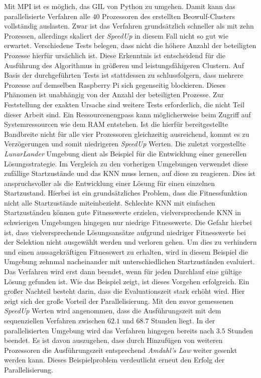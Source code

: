 Mit \ac{MPI} ist es möglich, das \ac{GIL} von Python zu umgehen. Damit kann das parallelisierte Verfahren alle $40$ Prozessoren des erstellten Beowulf-Clusters vollständig auslasten. Zwar ist das Verfahren grundsätzlich schneller als mit zehn Prozessen, allerdings skaliert der \emph{SpeedUp} in diesem Fall nicht so gut wie erwartet. Verschiedene Tests belegen, dass nicht die höhere Anzahl der beteiligten Prozesse hierfür ursächlich ist. Diese Erkenntnis ist entscheidend für die Ausführung des Algorithmus in größeren und leistungsfähigeren Clustern. Auf Basis der durchgeführten Tests ist stattdessen zu schlussfolgern, dass mehrere Prozesse auf demselben Raspberry Pi sich gegenseitig blockieren. Dieses Phänomen ist unabhängig von der Anzahl der beteiligten Prozesse. Zur Feststellung der exakten Ursache sind weitere Tests erforderlich, die nicht Teil dieser Arbeit sind. Ein Ressourcenengpass kann möglicherweise beim Zugriff auf Systemressourcen wie dem \ac{RAM} entstehen. Ist die hierfür bereitgestellte Bandbreite nicht für alle vier Prozessoren gleichzeitig ausreichend, kommt es zu Verzögerungen und somit niedrigeren \emph{SpeedUp} Werten. Die zuletzt vorgestellte \emph{LunarLander} Umgebung dient als Beispiel für die Entwicklung einer generellen Lösungsstrategie. Im Vergleich zu den vorherigen Umgebungen verwendet diese zufällige Startzustände und das \ac{KNN} muss lernen, auf diese zu reagieren. Dies ist anspruchsvoller als die Entwicklung einer Lösung für einen einzelnen Startzustand. Hierbei ist ein grundsätzliches Problem, dass die Fitnessfunktion nicht alle Startzustände miteinbezieht. Schlechte \ac{KNN} mit einfachen Startzuständen können gute Fitnesswerte erzielen, vielversprechende \ac{KNN} in schwierigen Umgebungen hingegen nur niedrige Fitnesswerte. Die Gefahr hierbei ist, dass vielversprechende Lösungsansätze aufgrund niedriger Fitnesswerte bei der Selektion nicht ausgewählt werden und verloren gehen. Um dies zu verhindern und einen aussagekräftigen Fitnesswert zu erhalten, wird in diesem Beispiel die Umgebung zehnmal nacheinander mit unterschiedlichen Startzuständen evaluiert. Das Verfahren wird erst dann beendet, wenn für jeden Durchlauf eine gültige Lösung gefunden ist. Wie das Beispiel zeigt, ist dieses Vorgehen erfolgreich. Ein großer Nachteil besteht darin, dass die Evaluationszeit stark erhöht wird. Hier zeigt sich der große Vorteil der Parallelisierung. Mit den zuvor gemessenen \emph{SpeedUp} Werten wird angenommen, dass die Ausführungszeit mit dem sequenziellen Verfahren zwischen $62.1$ und $68.7$ Stunden liegt. In der parallelisierten Umgebung wird das Verfahren hingegen bereits nach $3.5$ Stunden beendet. Es ist davon auszugehen, dass durch Hinzufügen von weiteren Prozessoren die Ausführungszeit entsprechend \emph{Amdahl's Law} weiter gesenkt werden kann. Dieses Beispielproblem verdeutlicht erneut den Erfolg der Parallelisierung.
